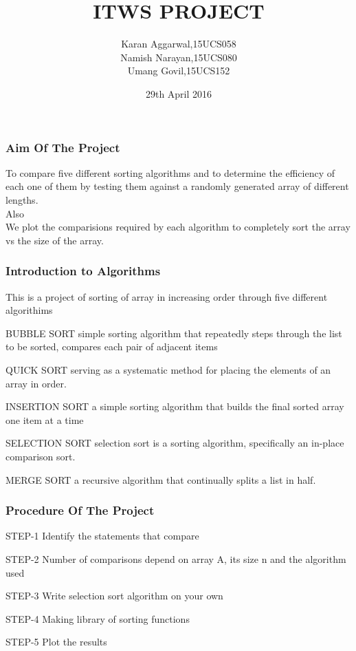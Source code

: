 \documentclass{beamer}
\title{ITWS PROJECT}
\author{Karan Aggarwal,15UCS058\\Namish Narayan,15UCS080\\Umang Govil,15UCS152}
\institute{Submitted to:-Mr Kshitiz Verma}
\date{29th April 2016}
\begin{document}
\frame{\titlepage}
\begin{frame}
\frametitle{Aim Of The Project}
To compare five different sorting algorithms and to determine the efficiency of each one of them by testing them against a randomly generated array of different lengths.\\
Also\\
We plot the comparisions required by each algorithm to completely sort the array vs the size of the array.

\end{frame}
 
\begin{frame}
\frametitle{Introduction to Algorithms}
This is a project of sorting of array in increasing order through five different algorithims\\
\begin{block}{BUBBLE SORT}
 simple sorting algorithm that repeatedly steps through the list to be sorted, compares each pair of adjacent items
\end{block}
\begin{block}{QUICK SORT}
 serving as a systematic method for placing the elements of an array in order.
\end{block}
\begin{block}{INSERTION SORT}
a simple sorting algorithm that builds the final sorted array one item at a time
\end{block}
\begin{block}{SELECTION SORT}
selection sort is a sorting algorithm, specifically an in-place comparison sort. 
\end{block}
\begin{block}{MERGE SORT}
 a recursive algorithm that continually splits a list in half.
\end{block}





\end{frame}
\begin{frame}
\frametitle{Procedure Of The Project}
\begin{block}{STEP-1}
Identify the statements that compare
\end{block}

\begin{block}{STEP-2}
Number of comparisons depend on array A, its size n and the algorithm used
\end{block}
\begin{block}{STEP-3}
Write selection sort algorithm on your own
\end{block}
\begin{block}{STEP-4}
Making library of sorting functions
\end{block}
\begin{block}{STEP-5}
 Plot the results
\end{block}



\end{frame}
\end{document}
